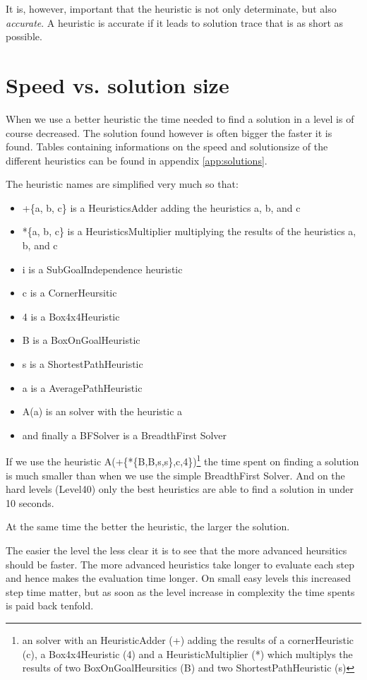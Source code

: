 It is, however, important that the heuristic is not only determinate,
but also \emph{accurate}. A heuristic is accurate if it leads to
solution trace that is as short as possible.

\section{Speed vs. solution size}
When we use a better heuristic the time needed to find a solution in a level is of course decreased. The solution found however is often bigger the faster it is found. Tables containing informations on the speed and solutionsize of the different heuristics can be found in appendix \ref{app:solutions}.

The heuristic names are simplified very much so that:
\begin{itemize}
\item +\{a, b, c\} is a HeuristicsAdder adding the heuristics a, b, and c
\item *\{a, b, c\} is a HeuristicsMultiplier multiplying the results of the heuristics a, b, and c
\item i is a SubGoalIndependence heuristic
\item c is a CornerHeursitic
\item 4 is a Box4x4Heuristic
\item B is a BoxOnGoalHeuristic
\item s is a ShortestPathHeuristic
\item a is a AveragePathHeuristic
\item A(a) is an \astar solver with the heuristic a
\item and finally a BFSolver is a BreadthFirst Solver
\end{itemize}

If we use the heuristic A(+\{*\{B,B,s,s\},c,4\})\footnote{an \astar solver with an HeuristicAdder (+) adding the results of a cornerHeuristic (c), a Box4x4Heuristic (4) and a HeuristicMultiplier (*) which multiplys the results of two BoxOnGoalHeursitics (B) and two ShortestPathHeuristic (s)} the time spent on finding a solution is much smaller than when we use the simple BreadthFirst Solver. And on the hard levels (Level40) only the best heuristics are able to find a solution in under 10 seconds.

At the same time the better the heuristic, the larger the solution.

The easier the level the less clear it is to see that the more advanced heursitics should be faster. The more advanced heuristics take longer to evaluate each step and hence makes the evaluation time longer. On small easy levels this increased step time matter, but as soon as the level increase in complexity the time spents is paid back tenfold.

